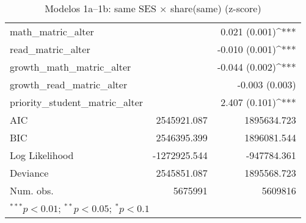 \begin{table}
\begin{center}
\begin{tabular}{l D{)}{)}{11)3} D{)}{)}{11)3}}
math\_matric\_alter                &                         & 0.021 \; (0.001)^{***}  \\
read\_matric\_alter                &                         & -0.010 \; (0.001)^{***} \\
growth\_math\_matric\_alter        &                         & -0.044 \; (0.002)^{***} \\
growth\_read\_matric\_alter        &                         & -0.003 \; (0.003)       \\
priority\_student\_matric\_alter   &                         & 2.407 \; (0.101)^{***}  \\
\midrule
AIC                                & 2545921.087             & 1895634.723             \\
BIC                                & 2546395.399             & 1896081.544             \\
Log Likelihood                     & -1272925.544            & -947784.361             \\
Deviance                           & 2545851.087             & 1895568.723             \\
Num. obs.                          & 5675991                 & 5609816                 \\
\bottomrule
{}
\end{tabular}
\caption{Modelos 1a–1b: same SES × share(same) (z-score)}
\label{tab:ses_same_share}
\end{center}
\end{table}
